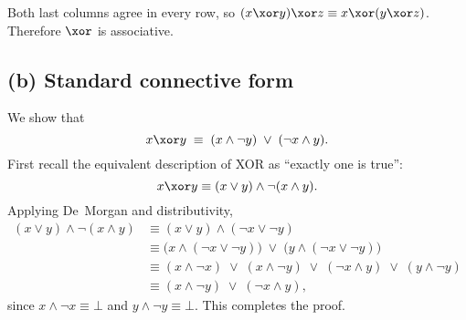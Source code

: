 Both last columns agree in every row, so $(x \xor y)\xor z \equiv x \xor (y \xor z)$.
Therefore $\xor$ is associative.

\subsection*{(b) Standard connective form}

We show that
\[
x \xor y \;\equiv\; (x \land \lnot y) \;\lor\; (\lnot x \land y).
\]
First recall the equivalent description of XOR as ``exactly one is true'':
\[
x \xor y \equiv (x \lor y)\land \lnot(x \land y).
\]
Applying De~Morgan and distributivity,
\[
\begin{aligned}
(x \lor y)\land \lnot(x \land y)
&\equiv (x \lor y)\land (\lnot x \lor \lnot y) \\
&\equiv \bigl(x\land(\lnot x \lor \lnot y)\bigr)\;\lor\;\bigl(y\land(\lnot x \lor \lnot y)\bigr) \\
&\equiv (x\land\lnot x)\;\lor\;(x\land\lnot y)\;\lor\;(\lnot x\land y)\;\lor\;(y\land\lnot y) \\
&\equiv (x\land\lnot y)\;\lor\;(\lnot x\land y),
\end{aligned}
\]
since $x\land\lnot x \equiv \bot$ and $y\land\lnot y \equiv \bot$.
This completes the proof.
